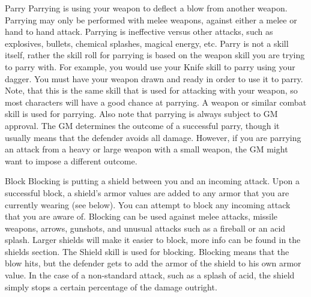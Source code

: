 \documentclass[twoside]{book}
\begin{document}
                
                 Parry   
                   Parrying is using your weapon to deflect a blow
                  from another weapon. Parrying may only be performed
                  with melee weapons, against either a melee or hand to
                  hand attack. Parrying is ineffective versus other
                  attacks, such as explosives, bullets, chemical
                  splashes, magical energy, etc. Parry is not a skill
                  itself, rather the skill roll for parrying is based on
                  the weapon skill you are trying to parry with. For
                  example, you would use your Knife skill to parry using
                  your dagger. You must have your weapon drawn and ready
                  in order to use it to parry. Note, that this is the
                  same skill that is used for attacking with your weapon,
                  so most characters will have a good chance at parrying.
                   A weapon or similar combat skill is used for
                   parrying. Also note that parrying is always subject to
                   GM approval. The GM determines the outcome of a
                   successful parry, though it usually means that the
                   defender avoids all damage. However, if you are
                   parrying an attack from a heavy or large weapon with a
                   small weapon, the GM might want to impose a different
                   outcome. 
                  
                
                
                 Block   
                   Blocking is putting a shield between you and an
                  incoming attack.
                    Upon a successful block, a shield’s armor
                    values are added to any armor that you are currently
                    wearing   (see below). You can attempt to
                    block any incoming attack that you are aware of.
                    Blocking can be used against melee attacks, missile
                    weapons, arrows, gunshots, and unusual attacks such
                    as a fireball or an acid splash. Larger shields will
                    make it easier to block, more info can be found in
                    the shields section.
                    The Shield skill is used for blocking. Blocking
                    means that the blow hits, but the defender gets to
                    add the armor of the shield to his own armor value.
                      In the case of a non-standard attack, such
                    as a splash of acid, the shield simply stops a
                    certain percentage of the damage outright.
                  
\end{document}
